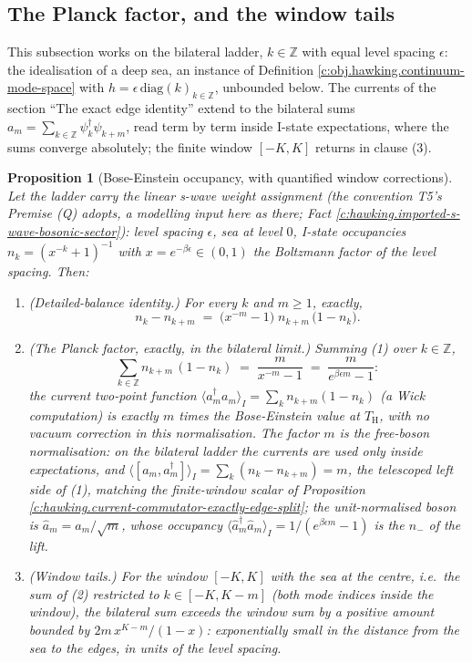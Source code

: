 \documentclass[11pt]{article}
\newtheorem{proposition}[theorem]{Proposition}
\theoremstyle{definition}
\theoremstyle{plain}
\providecommand{\TH}{}\renewcommand{\TH}{T_{\mathrm{H}}}
\providecommand{\Z}{}\renewcommand{\Z}{\mathbb{Z}}
\begin{document}
\subsection*{The Planck factor, and the window tails}
\label{c:note.hawking.setting-planck-factor-window-tails}
This subsection works on the bilateral ladder, $k \in \Z$ with equal level spacing $\epsilon$: the idealisation of a deep sea, an instance of Definition \ref{c:obj.hawking.continuum-mode-space} with $h = \epsilon\,\mathrm{diag}(k)_{k \in \Z}$, unbounded below. The currents of the section ``The exact edge identity'' extend to the bilateral sums $a_m = \sum_{k \in \Z}\psi_k^\dagger\psi_{k+m}$, read term by term inside I-state expectations, where the sums converge absolutely; the finite window $[-K, K]$ returns in clause (3).

\begin{proposition}[Bose-Einstein occupancy, with quantified window corrections]\label{c:hawking.bose-einstein-occupancy-quantified-window-corrections}
Let the ladder carry the linear s-wave weight assignment (the convention T5's Premise (Q) adopts, a modelling input here as there; Fact \ref{c:hawking.imported-s-wave-bosonic-sector}): level spacing $\epsilon$, sea at level $0$, I-state occupancies $n_k = (x^{-k} + 1)^{-1}$ with $x = e^{-\beta\epsilon} \in (0,1)$ the Boltzmann factor of the level spacing. Then:
\begin{enumerate}
\item \emph{(Detailed-balance identity.)} For every $k$ and $m \ge 1$, exactly,
\[
n_k - n_{k+m} \;=\; \bigl(x^{-m} - 1\bigr)\; n_{k+m}\,\bigl(1 - n_k\bigr).
\]
\item \emph{(The Planck factor, exactly, in the bilateral limit.)} Summing (1) over $k \in \Z$,
\[
\sum_{k \in \Z} n_{k+m}\,(1 - n_k) \;=\; \frac{m}{x^{-m} - 1} \;=\; \frac{m}{e^{\beta\epsilon m} - 1}:
\]
the current two-point function $\langle a_m^\dagger a_m\rangle_I = \sum_k n_{k+m}(1 - n_k)$ (a Wick computation) is exactly $m$ times the Bose-Einstein value at $\TH$, with no vacuum correction in this normalisation. The factor $m$ is the free-boson normalisation: on the bilateral ladder the currents are used only inside expectations, and $\langle [a_m, a_m^\dagger]\rangle_I = \sum_k (n_k - n_{k+m}) = m$, the telescoped left side of (1), matching the finite-window scalar of Proposition \ref{c:hawking.current-commutator-exactly-edge-split}; the unit-normalised boson is $\hat a_m = a_m/\sqrt{m}$, whose occupancy $\langle \hat a_m^\dagger \hat a_m\rangle_I = 1/(e^{\beta\epsilon m} - 1)$ is the $n_-$ of the lift.
\item \emph{(Window tails.)} For the window $[-K, K]$ with the sea at the centre, i.e.\ the sum of (2) restricted to $k \in [-K, K-m]$ (both mode indices inside the window), the bilateral sum exceeds the window sum by a positive amount bounded by $2m\,x^{K - m}/(1 - x)$: exponentially small in the distance from the sea to the edges, in units of the level spacing.
\end{enumerate}
\end{proposition}
\end{document}
